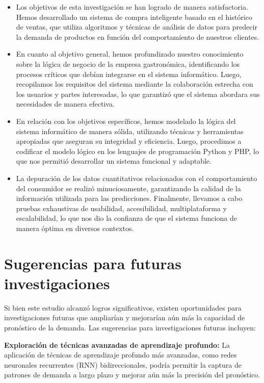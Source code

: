 \begin{itemize}
    \item Los objetivos de esta investigación se han logrado de manera satisfactoria. Hemos desarrollado un sistema de compra inteligente basado en el histórico de ventas, que utiliza algoritmos y técnicas de análisis de datos para predecir la demanda de productos en función del comportamiento de nuestros clientes.

    \item En cuanto al objetivo general, hemos profundizado nuestro conocimiento sobre la lógica de negocio de la empresa gastronómica, identificando los procesos críticos que debían integrarse en el sistema informático. Luego, recopilamos los requisitos del sistema mediante la colaboración estrecha con los usuarios y partes interesadas, lo que garantizó que el sistema abordara sus necesidades de manera efectiva.
    
    \item En relación con los objetivos específicos, hemos modelado la lógica del sistema informático de manera sólida, utilizando técnicas y herramientas apropiadas que aseguran su integridad y eficiencia. Luego, procedimos a codificar el modelo lógico en los lenguajes de programación Python y PHP, lo que nos permitió desarrollar un sistema funcional y adaptable.
    
    \item La depuración de los datos cuantitativos relacionados con el comportamiento del consumidor se realizó minuciosamente, garantizando la calidad de la información utilizada para las predicciones. Finalmente, llevamos a cabo pruebas exhaustivas de usabilidad, accesibilidad, multiplataforma y escalabilidad, lo que nos dio la confianza de que el sistema funciona de manera óptima en diversos contextos.
    
\end{itemize}
\section{Sugerencias para futuras investigaciones}
Si bien este estudio alcanzó logros significativos, existen oportunidades para investigaciones futuras que ampliarían y mejorarían aún más la capacidad de pronóstico de la demanda. Las sugerencias para investigaciones futuras incluyen:

\textbf{Exploración de técnicas avanzadas de aprendizaje profundo:} La aplicación de técnicas de aprendizaje profundo más avanzadas, como redes neuronales recurrentes (RNN) bidireccionales, podría permitir la captura de patrones de demanda a largo plazo y mejorar aún más la precisión del pronóstico.

